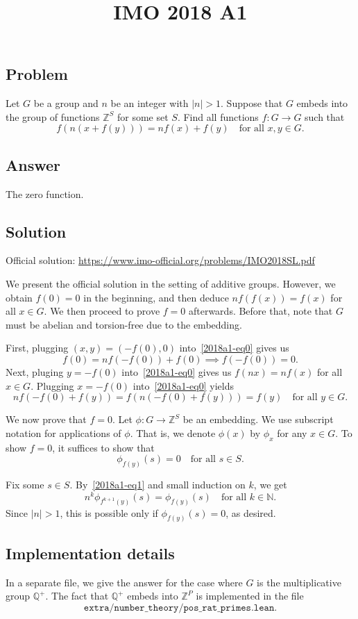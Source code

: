 \documentclass{article}
\title{IMO 2018 A1}
\author{}
\date{}
\newcommand{\Z}{\mathbb{Z}}
\newcommand{\N}{\mathbb{N}}
\newcommand{\Q}{\mathbb{Q}}
\begin{document}
\maketitle



\subsection*{Problem}

Let $G$ be a group and $n$ be an integer with $|n| > 1$.
Suppose that $G$ embeds into the group of functions $\Z^S$ for some set $S$.
Find all functions $f : G \to G$ such that
\[ f(n(x + f(y))) = n f(x) + f(y) \quad \text{for all } x, y \in G. \tag{*}\label{2018a1-eq0} \]



\subsection*{Answer}

The zero function.



\subsection*{Solution}

Official solution: \url{https://www.imo-official.org/problems/IMO2018SL.pdf}

We present the official solution in the setting of additive groups.
However, we obtain $f(0) = 0$ in the beginning, and then deduce $n f(f(x)) = f(x)$ for all $x \in G$.
We then proceed to prove $f = 0$ afterwards.
Before that, note that $G$ must be abelian and torsion-free due to the embedding.

First, plugging $(x, y) = (-f(0), 0)$ into~\eqref{2018a1-eq0} gives us
\[ f(0) = n f(-f(0)) + f(0) \implies f(-f(0)) = 0. \]
Next, pluging $y = -f(0)$ into~\eqref{2018a1-eq0} gives us $f(nx) = n f(x)$ for all $x \in G$.
Plugging $x = -f(0)$ into~\eqref{2018a1-eq0} yields
\[ n f(-f(0) + f(y)) = f(n (-f(0) + f(y))) = f(y) \quad \text{for all } y \in G. \tag{1}\label{2018a1-eq1} \]

We now prove that $f = 0$.
Let $\phi : G \to \Z^S$ be an embedding.
We use subscript notation for applications of $\phi$.
That is, we denote $\phi(x)$ by $\phi_x$ for any $x \in G$.
To show $f = 0$, it suffices to show that
\[ \phi_{f(y)}(s) = 0 \quad \text{for all } s \in S. \]

Fix some $s \in S$.
By~\eqref{2018a1-eq1} and small induction on $k$, we get
\[ n^k \phi_{f^{k + 1}(y)}(s) = \phi_{f(y)}(s) \quad \text{for all } k \in \N. \]
Since $|n| > 1$, this is possible only if $\phi_{f(y)}(s) = 0$, as desired.



\subsection*{Implementation details}

In a separate file, we give the answer for the case where $G$ is the multiplicative group $\Q^+$.
The fact that $\Q^+$ embeds into $\Z^P$ is implemented in the file
\[ \texttt{extra/number\_theory/pos\_rat\_primes.lean}. \]
\end{document}
